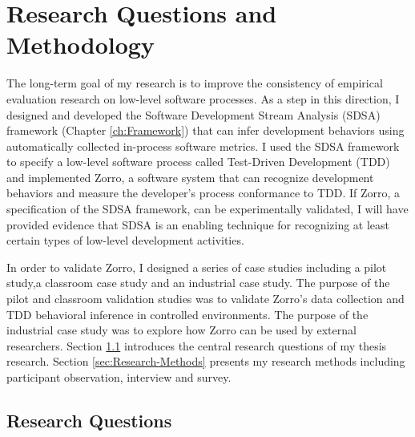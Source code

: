 \chapter{Research Questions and Methodology}
\label{ch:Research}
The long-term goal of my research is to improve the consistency of empirical evaluation research on low-level software processes. As a step in this direction, I designed and developed the Software Development Stream Analysis (SDSA) framework (Chapter \ref{ch:Framework}) that can infer development behaviors using automatically collected in-process software metrics. I used the SDSA framework to specify a low-level software process called Test-Driven Development (TDD) and implemented Zorro, a software system that can recognize development behaviors and measure the developer's process conformance to TDD. If Zorro, a specification of the SDSA framework, can be experimentally validated, I will have provided evidence that SDSA is an enabling technique for recognizing at least certain types of low-level development activities. 

In order to validate Zorro, I designed a series of case studies including a pilot study,a classroom case study and an industrial case study. The purpose of the pilot and classroom validation studies was to validate Zorro's data collection and TDD behavioral inference 
in controlled environments. The purpose of the industrial case study was to explore how Zorro can be used by external researchers. Section \ref{sec:Research-Questions} introduces the central research questions of my thesis research. Section \ref{sec:Research-Methods} presents my research methods including participant observation, interview and survey. 

\section{Research Questions}
\label{sec:Research-Questions}

\begin{comment}
If Zorro can correctly recognize development behaviors of TDD, 
then it can be used to assess process conformance during daily 
practice of TDD, as well as during empirical evaluation of TDD
to improve construct validity (see Chapter \ref{ch:RelatedWork} 
for details). However, does Zorro infer developers' TDD development
behaviors correctly? Will it falsely categorize some non-TDD
development behaviors as TDD? Or, will it misinterpret some TDD
development behaviors as non-TDD? To answer these questions, we 
need to conduct Zorro validation studies. 
\end{comment}

